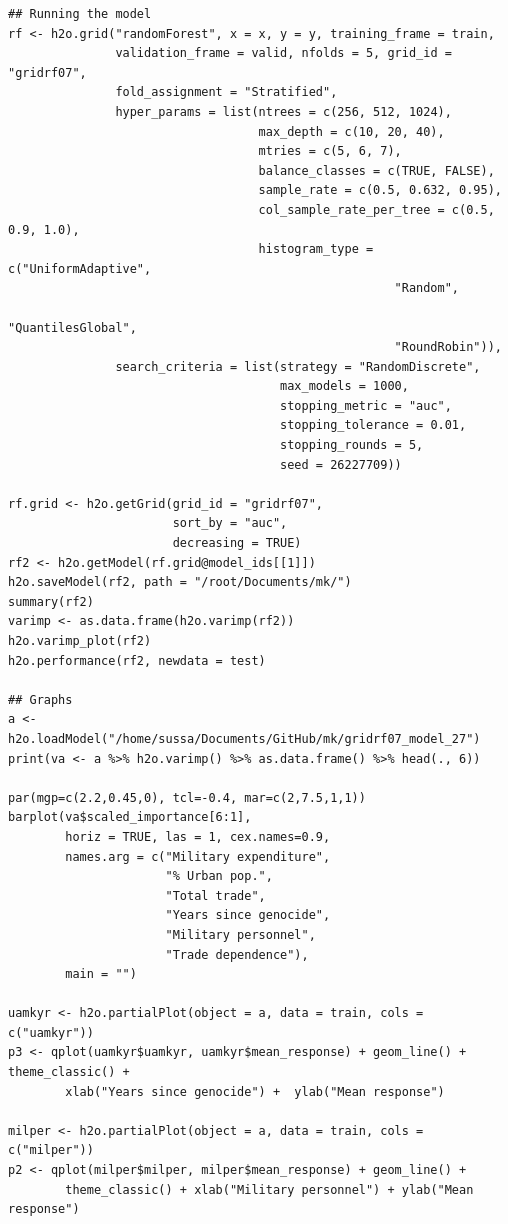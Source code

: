 \begin{verbatim}
## Running the model
rf <- h2o.grid("randomForest", x = x, y = y, training_frame = train, 
               validation_frame = valid, nfolds = 5, grid_id = "gridrf07",
               fold_assignment = "Stratified",
               hyper_params = list(ntrees = c(256, 512, 1024),
                                   max_depth = c(10, 20, 40),
                                   mtries = c(5, 6, 7),
                                   balance_classes = c(TRUE, FALSE),
                                   sample_rate = c(0.5, 0.632, 0.95),
                                   col_sample_rate_per_tree = c(0.5, 0.9, 1.0),
                                   histogram_type = c("UniformAdaptive",
                                                      "Random",
                                                      "QuantilesGlobal",
                                                      "RoundRobin")),
               search_criteria = list(strategy = "RandomDiscrete", 
                                      max_models = 1000, 
                                      stopping_metric = "auc", 
                                      stopping_tolerance = 0.01, 
                                      stopping_rounds = 5, 
                                      seed = 26227709)) 

rf.grid <- h2o.getGrid(grid_id = "gridrf07",
                       sort_by = "auc",
                       decreasing = TRUE)
rf2 <- h2o.getModel(rf.grid@model_ids[[1]])
h2o.saveModel(rf2, path = "/root/Documents/mk/")
summary(rf2)
varimp <- as.data.frame(h2o.varimp(rf2))
h2o.varimp_plot(rf2)
h2o.performance(rf2, newdata = test)

## Graphs
a <- h2o.loadModel("/home/sussa/Documents/GitHub/mk/gridrf07_model_27")
print(va <- a %>% h2o.varimp() %>% as.data.frame() %>% head(., 6)) 

par(mgp=c(2.2,0.45,0), tcl=-0.4, mar=c(2,7.5,1,1))
barplot(va$scaled_importance[6:1],
        horiz = TRUE, las = 1, cex.names=0.9,
        names.arg = c("Military expenditure",
                      "% Urban pop.", 
                      "Total trade",
                      "Years since genocide", 
                      "Military personnel", 
                      "Trade dependence"),
        main = "")

uamkyr <- h2o.partialPlot(object = a, data = train, cols = c("uamkyr"))
p3 <- qplot(uamkyr$uamkyr, uamkyr$mean_response) + geom_line() + theme_classic() + 
        xlab("Years since genocide") +  ylab("Mean response")

milper <- h2o.partialPlot(object = a, data = train, cols = c("milper"))
p2 <- qplot(milper$milper, milper$mean_response) + geom_line() +
        theme_classic() + xlab("Military personnel") + ylab("Mean response")


\end{verbatim}
